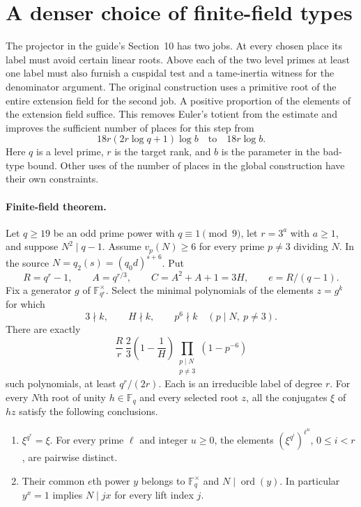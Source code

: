 \section{A denser choice of finite-field types}
\label{sec:denser-labels}

The projector in the guide's Section~10 has two jobs. At every chosen place its label must avoid certain linear roots. Above each of the two level primes at least one label must also furnish a cuspidal test and a tame-inertia witness for the denominator argument. The original construction uses a primitive root of the entire extension field for the second job. A positive proportion of the elements of the extension field suffice. This removes Euler's totient from the estimate and improves the sufficient number of places for this step from
\[
  18r(2r\log q+1)\log b \quad\text{to}\quad 18r\log b.
\]
Here $q$ is a level prime, $r$ is the target rank, and $b$ is the parameter in the bad-type bound. Other uses of the number of places in the global construction have their own constraints.

\paragraph{Finite-field theorem.}
Let $q\ge19$ be an odd prime power with $q\equiv1\pmod9$, let $r=3^a$ with $a\ge1$, and suppose $N^2\mid q-1$. Assume $v_p(N)\ge6$ for every prime $p\ne3$ dividing $N$. In the source $N=q_2(s)=(q_0d)^{s+6}$. Put
\[
 R=q^r-1,\qquad A=q^{r/3},\qquad C=A^2+A+1=3H,\qquad e=R/(q-1).
\]
Fix a generator $g$ of $\mathbb F_{q^r}^{\times}$. Select the minimal polynomials of the elements $z=g^k$ for which
\begin{equation}
  3\nmid k,\qquad H\nmid k,\qquad p^6\nmid k\quad(p\mid N,\ p\ne3).
  \label{eq:label-selection}
\end{equation}
There are exactly
\begin{equation}
 \frac{R}{r}\,\frac23\left(1-\frac1H\right)
              \prod_{\substack{p\mid N\\p\ne3}}(1-p^{-6})
 \label{eq:label-count}
\end{equation}
such polynomials, at least $q^r/(2r)$. Each is an irreducible label of degree $r$. For every $N$th root of unity $h\in\mathbb F_q$ and every selected root $z$, all the conjugates $\xi$ of $hz$ satisfy the following conclusions.
\begin{enumerate}
\item $\xi^{q^r}=\xi$. For every prime $\ell$ and integer $u\ge0$, the elements $(\xi^{q^i})^{\ell^u}$, $0\le i<r$, are pairwise distinct.
\item Their common $e$th power $y$ belongs to $\mathbb F_q^{\times}$ and $N\mid\operatorname{ord}(y)$. In particular $y^x=1$ implies $N\mid jx$ for every lift index $j$.
\end{enumerate}

